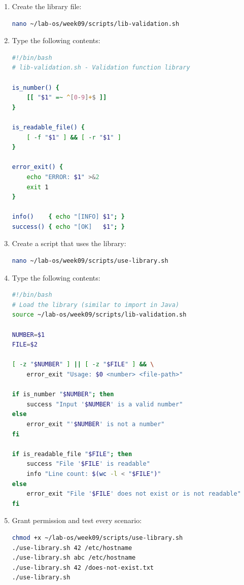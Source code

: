 \begin{enumerate}
  \item Create the library file:
\begin{lstlisting}[language=bash, caption={Creating lib-validation.sh}]
nano ~/lab-os/week09/scripts/lib-validation.sh
\end{lstlisting}

  \item Type the following contents:
\begin{lstlisting}[language=bash, caption={Contents of lib-validation.sh}]
#!/bin/bash
# lib-validation.sh - Validation function library

is_number() {
    [[ "$1" =~ ^[0-9]+$ ]]
}

is_readable_file() {
    [ -f "$1" ] && [ -r "$1" ]
}

error_exit() {
    echo "ERROR: $1" >&2
    exit 1
}

info()    { echo "[INFO] $1"; }
success() { echo "[OK]   $1"; }
\end{lstlisting}

  \item Create a script that uses the library:
\begin{lstlisting}[language=bash, caption={Creating use-library.sh}]
nano ~/lab-os/week09/scripts/use-library.sh
\end{lstlisting}

  \item Type the following contents:
\begin{lstlisting}[language=bash, caption={Contents of use-library.sh}]
#!/bin/bash
# Load the library (similar to import in Java)
source ~/lab-os/week09/scripts/lib-validation.sh

NUMBER=$1
FILE=$2

[ -z "$NUMBER" ] || [ -z "$FILE" ] && \
    error_exit "Usage: $0 <number> <file-path>"

if is_number "$NUMBER"; then
    success "Input '$NUMBER' is a valid number"
else
    error_exit "'$NUMBER' is not a number"
fi

if is_readable_file "$FILE"; then
    success "File '$FILE' is readable"
    info "Line count: $(wc -l < "$FILE")"
else
    error_exit "File '$FILE' does not exist or is not readable"
fi
\end{lstlisting}

  \item Grant permission and test every scenario:
\begin{lstlisting}[language=bash, caption={Testing all scenarios}]
chmod +x ~/lab-os/week09/scripts/use-library.sh
./use-library.sh 42 /etc/hostname
./use-library.sh abc /etc/hostname
./use-library.sh 42 /does-not-exist.txt
./use-library.sh
\end{lstlisting}
\end{enumerate}

